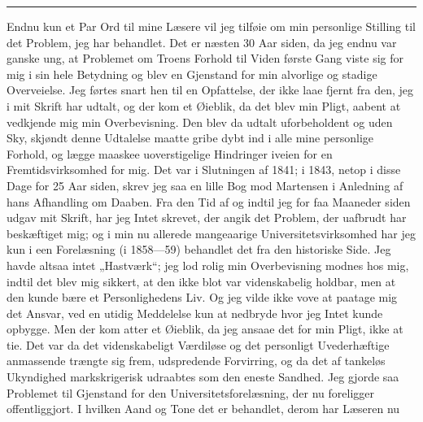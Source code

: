 \documentclass[12pt,a4paper]{book}
\newcommand{\opage}[1]{\marginnote{\footnotesize\textit{[#1]}}}
\begin{document}
\begin{center}\rule{2cm}{0.4pt}\end{center}

Endnu kun et Par Ord til mine Læsere vil jeg tilføie om min personlige Stilling
til det Problem, jeg har behandlet. Det er næsten 30 Aar siden, da jeg endnu var
ganske ung, at Problemet om Troens Forhold til Viden første Gang viste sig for
mig i sin hele Betydning og blev en Gjenstand for min alvorlige og stadige
Overveielse. Jeg førtes snart hen til en Opfattelse, der ikke laae fjernt fra
den, jeg i mit Skrift har udtalt, og der kom et Øieblik, da det blev min Pligt,
aabent at vedkjende mig min Overbevisning. Den blev da udtalt uforbeholdent og
uden Sky, skjøndt denne Udtalelse maatte gribe dybt ind i alle mine personlige
Forhold, og lægge maaskee uoverstigelige Hindringer iveien for en
Fremtidsvirksomhed for mig. Det var i Slutningen af 1841; i 1843, netop i disse
Dage for 25 Aar siden, skrev jeg saa en lille Bog mod Martensen i Anledning af
hans Afhandling om Daaben. Fra den Tid af og indtil jeg for faa Maaneder siden
udgav mit Skrift, har jeg Intet skrevet, der angik det Problem, der uafbrudt har
beskæftiget mig; og i min nu allerede mangeaarige Universitetsvirksomhed har jeg
kun i een Forelæsning (i 1858---59) behandlet det fra den historiske Side. Jeg
havde altsaa intet „Hastværk“; jeg lod rolig min Overbevisning modnes hos
\opage{30} mig, indtil det blev mig sikkert, at den ikke blot var videnskabelig holdbar,
men at den kunde bære et Personlighedens Liv. Og jeg vilde ikke vove at paatage
mig det Ansvar, ved en utidig Meddelelse kun at nedbryde hvor jeg Intet kunde
opbygge. Men der kom atter et Øieblik, da jeg ansaae det for min Pligt, ikke at
tie. Det var da det videnskabeligt Værdiløse og det personligt Uvederhæftige
anmassende trængte sig frem, udspredende Forvirring, og da det af tankeløs
Ukyndighed markskrigerisk udraabtes som den eneste Sandhed. Jeg gjorde saa
Problemet til Gjenstand for den Universitetsforelæsning, der nu foreligger
offentliggjort. I hvilken Aand og Tone det er behandlet, derom har Læseren nu
\end{document}
